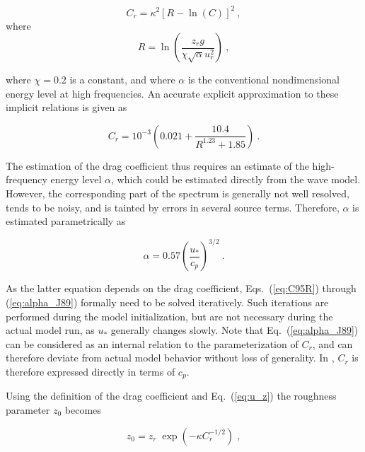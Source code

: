 
\begin{equation}
C_r = \kappa^2 \left [ R - \ln(C) \right ] ^2
\: , \label{eq:C95C} \end{equation} where \begin{equation}
R = \ln \left ( \frac{z_r g}{\chi \sqrt{\alpha} u_r^2} \right )
\: , \label{eq:C95R} \end{equation}

\noindent
where $\chi = 0.2$ is a constant, and where $\alpha$ is the conventional
nondimensional energy level at high frequencies. An accurate explicit
approximation to these implicit relations is given as

\begin{equation}
C_r = 10^{-3} \left ( 0.021 + \frac{10.4}{R^{1.23}+1.85} \right )
\: . \label{eq:C95Ca} \end{equation}

\noindent
The estimation of the drag coefficient thus requires an estimate of the
high-frequency energy level $\alpha$, which could be estimated directly from
the wave model. However, the corresponding part of the spectrum is generally
not well resolved, tends to be noisy, and is tainted by errors in several
source terms. Therefore, $\alpha$ is estimated parametrically as
\citep{art:Jan89}


\begin{equation}
\alpha = 0.57 \left ( \frac{u_\ast}{c_p} \right )^{3/2}
\: . \label{eq:alpha_J89} \end{equation}

\noindent
As the latter equation depends on the drag coefficient, Eqs.~(\ref{eq:C95R})
through (\ref{eq:alpha_J89}) formally need to be solved iteratively. Such
iterations are performed during the model initialization, but are not
necessary during the actual model run, as $u_\ast$ generally changes
slowly. Note that Eq.~(\ref{eq:alpha_J89}) can be considered as an internal
relation to the parameterization of $C_r$, and can therefore deviate from
actual model behavior without loss of generality. In \cite{tol:JPO96}, $C_r$
is therefore expressed directly in terms of $c_p$.

Using the definition of the drag coefficient and Eq.~(\ref{eq:u_z}) the
roughness parameter $z_0$ becomes


\begin{equation}
z_0 = z_r \; \exp \left ( - \kappa C_r^{-1/2} \right )
\; , \label{eq:z0} \end{equation}

